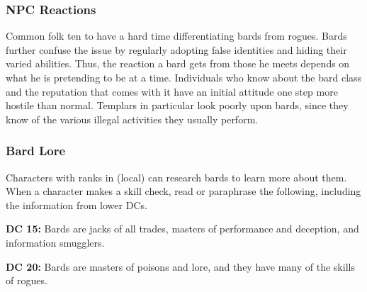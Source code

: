 \subsubsection{NPC Reactions}

Common folk ten to have a hard time differentiating bards from rogues. Bards further confuse the issue by regularly adopting false identities and hiding their varied abilities. Thus, the reaction a bard gets from those he meets depends on what he is pretending to be at a time. Individuals who know about the bard class and the reputation that comes with it have an initial attitude one step more hostile than normal. Templars in particular look poorly upon bards, since they know of the various illegal activities they usually perform.

\subsubsection{Bard Lore}

Characters with ranks in  (local) can research bards to learn more about them. When a character makes a skill check, read or paraphrase the following, including the information from lower DCs.

\textbf{DC 15:} Bards are jacks of all trades, masters of performance and deception, and information smugglers.

\textbf{DC 20:} Bards are masters of poisons and lore, and they have many of the skills of rogues.